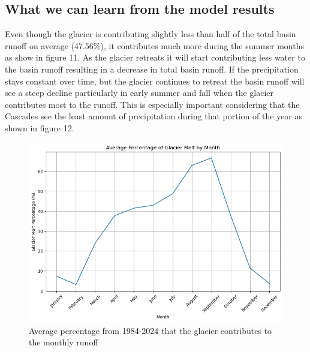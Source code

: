 \documentclass{article}
\begin{document}
\subsection{What we can learn from the model results}
Even though the glacier is contributing slightly less than half of the total basin runoff on average (47.56\%), it contributes much more during the summer 
months as show in figure 11. As the glacier retreats it will start contributing less water to the basin runoff resulting in a decrease in total 
basin runoff. If the precipitation stays constant over time, but the glacier continues to retreat the basin runoff will see a steep decline 
particularly in early summer and fall when the glacier contributes most to the runoff. This is especially important considering that the 
Cascades see the least amount of precipitation during that portion of the year as shown in figure 12.
\begin{figure}[h]
    \centering
    \includegraphics[width=\textwidth]{Plots/percent_glac_melt_month.png}
    \caption{Average percentage from 1984-2024 that the glacier contributes to the monthly runoff}
    \label{fig:percent_glacier_runoff}
\end{figure}
\FloatBarrier\
\end{document}
